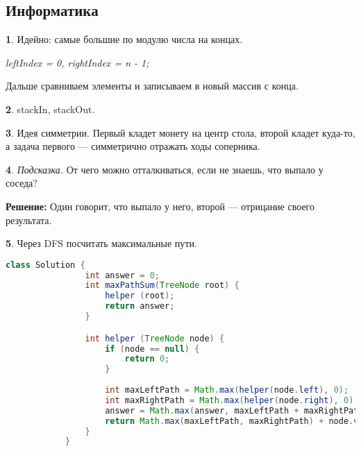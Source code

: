 \documentclass[14pt, a4paper]{extarticle}
\theoremstyle{definition}
\newtheorem{problem}{}
\theoremstyle{definition}
\theoremstyle{remark}
\numberwithin{equation}{section}
\begin{document}
\subsection*{Информатика}
\setcounter{problem}{0}

\begin{problem}
    Идейно: самые большие по модулю числа на концах.

    \textit{leftIndex = 0, rightIndex = n - 1;}

    Дальше сравниваем элементы и записываем в новый массив с конца.
\end{problem}

\begin{problem}
    stackIn, stackOut.
\end{problem}

\begin{problem}
    Идея симметрии. Первый кладет монету на центр стола, второй кладет
    куда-то, а задача первого --- симметрично отражать ходы соперника.
\end{problem}

\begin{problem}
    \textit{Подсказка.} От чего можно отталкиваться, если не знаешь, 
    что выпало у соседа?

    \textbf{Решение:} Один говорит, что выпало у него, второй --- 
    отрицание своего результата.
\end{problem}

\begin{problem}
    Через DFS посчитать максимальные пути.
    \begin{footnotesize}
        \begin{lstlisting}[language=Java]
            class Solution {
                int answer = 0;
                int maxPathSum(TreeNode root) {
                    helper (root);
                    return answer;
                }

                int helper (TreeNode node) {
                    if (node == null) {
                        return 0;
                    }
                
                    int maxLeftPath = Math.max(helper(node.left), 0);
                    int maxRightPath = Math.max(helper(node.right), 0);
                    answer = Math.max(answer, maxLeftPath + maxRightPath + node.val);
                    return Math.max(maxLeftPath, maxRightPath) + node.val;
                }
            }
        \end{lstlisting}
    \end{footnotesize}
\end{problem}
\end{document}
